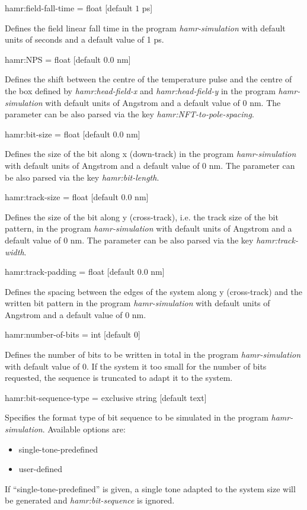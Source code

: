 {\zicf hamr:field-fall-time = float [default $1$ ps]}
Defines the field linear fall time in the program \textit{hamr-simulation} with default units of seconds and a default value of 1 ps.

{\zicf hamr:NPS = float [default $0.0$ nm]}
Defines the shift between the centre of the temperature pulse and the centre of the box defined by \textit{hamr:head-field-x} and \textit{hamr:head-field-y}
in the program \textit{hamr-simulation} with default units of Angstrom and a default value of 0 nm. 
The parameter can be also parsed via the key \textit{hamr:NFT-to-pole-spacing}.

{\zicf hamr:bit-size = float [default $0.0$ nm]}
Defines the size of the bit along x (down-track)
in the program \textit{hamr-simulation} with default units of Angstrom and a default value of 0 nm. 
The parameter can be also parsed via the key \textit{hamr:bit-length}.

{\zicf hamr:track-size = float [default $0.0$ nm]}
Defines the size of the bit along y (cross-track), i.e. the track size of the bit pattern,
in the program \textit{hamr-simulation} with default units of Angstrom and a default value of 0 nm. 
The parameter can be also parsed via the key \textit{hamr:track-width}.

{\zicf hamr:track-padding = float [default $0.0$ nm]}
Defines the spacing between the edges of the system along y (cross-track) and the written bit pattern
in the program \textit{hamr-simulation} with default units of Angstrom and a default value of 0 nm. 

{\zicf hamr:number-of-bits = int [default $0$]}
Defines the number of bits to be written in total in the program \textit{hamr-simulation} with default value of 0. 
If the system it too small for the number of bits requested, the sequence is truncated to adapt it to the system.

{\zicf hamr:bit-sequence-type =  exclusive string [default text]}
Specifies the format type of bit sequence to be simulated in the program \textit{hamr-simulation}. Available options are:
\begin{itemize}
	\item[] single-tone-predefined
	\item[] user-defined
\end{itemize}
If ``single-tone-predefined'' is given, a single tone adapted to the system size will be generated and \textit{ hamr:bit-sequence} is ignored.

